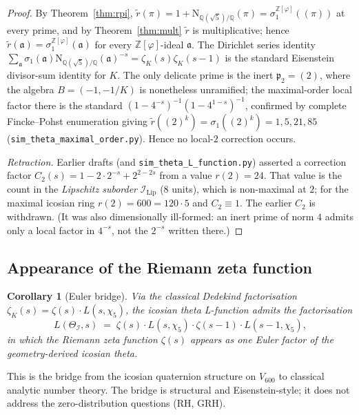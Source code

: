 \documentclass[11pt,a4paper]{article}
\newtheorem{corollary}[theorem]{Corollary}
\theoremstyle{definition}
\theoremstyle{remark}
\newcommand{\Z}{\mathbb{Z}}
\newcommand{\II}{\mathcal{I}}
\newcommand{\IIlip}{\mathcal{I}_{\mathrm{Lip}}}
\newcommand{\NQ}{\mathrm{N}_{\mathbb{Q}(\sqrt{5})/\mathbb{Q}}}
\newcommand{\Zphi}{\Z[\varphi]}
\begin{document}
\begin{proof}
By Theorem~\ref{thm:rpi}, $\widetilde r(\pi)=1+\NQ(\pi)=\sigma_1^{\Zphi}((\pi))$
at every prime, and by Theorem~\ref{thm:mult} $\widetilde r$ is multiplicative;
hence $\widetilde r(\mathfrak a)=\sigma_1^{\Zphi}(\mathfrak a)$ for every
$\Zphi$-ideal $\mathfrak a$. The Dirichlet series identity
$\sum_{\mathfrak a}\sigma_1(\mathfrak a)\NQ(\mathfrak a)^{-s}
=\zeta_K(s)\zeta_K(s-1)$ is the standard Eisenstein divisor-sum identity for
$K$. The only delicate prime is the inert $\mathfrak p_2=(2)$, where the
algebra $B=(-1,-1/K)$ is nonetheless unramified; the maximal-order local factor
there is the standard $(1-4^{-s})^{-1}(1-4^{1-s})^{-1}$, confirmed by complete
Fincke--Pohst enumeration giving $\widetilde r((2)^k)=\sigma_1((2)^k)=1,5,21,85$
(\texttt{sim\_theta\_maximal\_order.py}). Hence no local-$2$ correction occurs.

\emph{Retraction.} Earlier drafts (and \texttt{sim\_theta\_L\_function.py})
asserted a correction factor $C_2(s)=1-2\cdot2^{-s}+2^{2-2s}$ from a value
$r(2)=24$. That value is the count in the \emph{Lipschitz suborder} $\IIlip$
(8 units), which is non-maximal at $2$; for the maximal icosian ring
$r(2)=600=120\cdot5$ and $C_2\equiv 1$. The earlier $C_2$ is withdrawn. (It was
also dimensionally ill-formed: an inert prime of norm $4$ admits only a local
factor in $4^{-s}$, not the $2^{-s}$ written there.)
\end{proof}

\subsection{Appearance of the Riemann zeta function}

\begin{corollary}[Euler bridge]\label{cor:euler-bridge}
Via the classical Dedekind factorisation $\zeta_K(s) = \zeta(s)\!\cdot\! L(s,\chi_5)$,
the icosian theta L-function admits the factorisation
\[
  L(\Theta_\II, s) \;=\; \zeta(s)\!\cdot\! L(s,\chi_5)\!\cdot\! \zeta(s-1)\!\cdot\! L(s-1,\chi_5),
\]
in which the Riemann zeta function $\zeta(s)$ appears as one Euler factor of
the geometry-derived icosian theta.
\end{corollary}

This is the bridge from the icosian quaternion structure on $V_{600}$ to
classical analytic number theory. The bridge is structural and Eisenstein-style;
it does not address the zero-distribution questions (RH, GRH).

\bigskip
\end{document}

